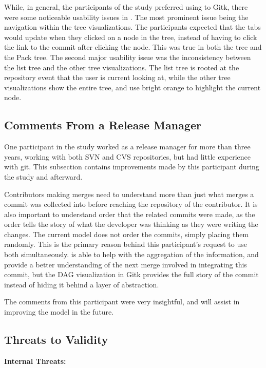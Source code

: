 While, in general, the participants of the study preferred using \tool
to Gitk, there were some noticeable usability issues in \tool. The most
prominent issue being the navigation within the tree visualizations. The
participants expected that the tabs would update when they clicked on a
node in the tree, instead of having to click the link to the commit
after clicking the node. This was true in both the \rt tree and the Pack
tree. The second major usability issue was the inconsistency between the
list tree and the other tree visualizations. The list tree is rooted at
the repository event that the user is current looking at, while the
other tree visualizations show the entire tree, and use bright orange to
highlight the current node.


\subsection{Comments From a Release Manager}
\label{sub:comments_from_a_release_manager}

One participant in the study worked as a release manager for more than
three years, working with both SVN and CVS repositories, but had little
experience with git. This subsection contains improvements made by this
participant during the study and afterward.

Contributors making merges need to understand more than just what merges
a commit was collected into before reaching the repository of the
contributor. It is also important to understand order that the related
commits were made, as the order tells the story of what the developer
was thinking as they were writing the changes. The current \mt model
does not order the commits, simply placing them randomly. This is the
primary reason behind this participant's request to use both
simultaneously. \tool is able to help with the aggregation of the
information, and provide a better understanding of the next merge
involved in integrating this commit, but the DAG visualization in Gitk
provides the full story of the commit instead of hiding it behind a
layer of abstraction.

The comments from this participant were very insightful, and will assist
in improving the model in the future.

\subsection{Threats to Validity}
\label{sub:threats}

\textbf{Internal Threats:}

